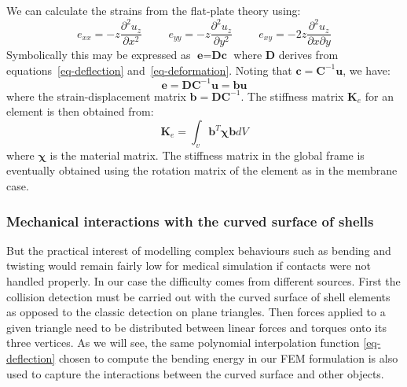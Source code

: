 \documentclass{llncs}
\begin{document}
We can calculate the strains from the flat-plate theory using:
\begin{equation}
\label{eq-deformation}
e_{xx} = -z \frac{\partial^2u_z}{\partial x^2}
\hspace{1cm}
e_{yy} = -z \frac{\partial^2u_z}{\partial y^2}
\hspace{1cm}
e_{xy} = -2z \frac{\partial^2u_z}{\partial x \partial y}
\end{equation} 
Symbolically this may be expressed as $\textbf{e} = \textbf{Dc}$ where $\textbf{D}$ derives from equations~\ref{eq-deflection} and~\ref{eq-deformation}. Noting that $\textbf{c} = \textbf{C}^{-1}\textbf{u}$, we have:
\begin{equation}
\textbf{e} = \textbf{DC}^{-1}\textbf{u} = \textbf{bu}
\end{equation} 
where the strain-displacement matrix $\textbf{b} = \textbf{DC}^{-1}$. 
The stiffness matrix $\textbf{K}_e$ for an element is then obtained from:
\begin{equation}
\textbf{K}_e = \int_v \textbf{b}^{T} \boldsymbol\chi \textbf{b} dV
\end{equation} 
where $\boldsymbol\chi$ is the material matrix. The stiffness matrix in the global frame is eventually obtained using the rotation matrix of the element as in the membrane case. 

\subsubsection{Mechanical interactions with the curved surface of shells}
\label{sec:interactions}
But the practical interest of modelling complex behaviours such as bending and twisting would remain fairly low for medical simulation if contacts were not handled properly. In our case the difficulty comes from different sources. First the collision detection must be carried out with the curved surface of shell elements as opposed to the classic detection on plane triangles. Then forces applied to a given triangle need to be distributed between linear forces and torques onto its three vertices.  As we will see, the same polynomial interpolation function \ref{eq-deflection} chosen to compute the bending energy in our FEM formulation is also used to capture the interactions between the curved surface and other objects. 
\end{document}
